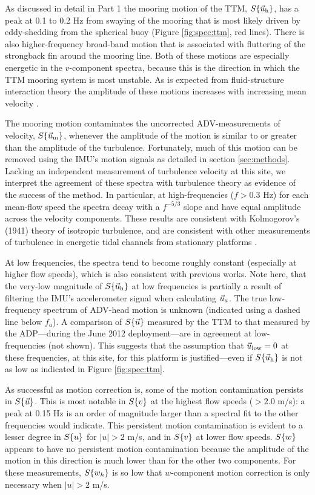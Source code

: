 As discussed in detail in Part 1 the mooring motion of the TTM, $S\{\vec{u}_\mathrm{h}\}$, has a peak at 0.1 to 0.2 Hz from swaying of the mooring that is most likely driven by eddy-shedding from the spherical buoy (Figure \ref{fig:spec:ttm}, red lines). There is also higher-frequency broad-band motion that is associated with fluttering of the strongback fin around the mooring line. Both of these motions are especially energetic in the $v$-component spectra, because this is the direction in which the TTM mooring system is most unstable. As is expected from fluid-structure interaction theory the amplitude of these motions increases with increasing mean velocity \cite[]{Morison++1950}.

The mooring motion contaminates the uncorrected ADV-measurements of velocity, $S\{\vec{u}_\mathrm{m}\}$, whenever the amplitude of the motion is similar to or greater than the amplitude of the turbulence. Fortunately, much of this motion can be removed using the IMU's motion signals as detailed in section \ref{sec:methods}. Lacking an independent measurement of turbulence velocity at this site, we interpret the agreement of these spectra with turbulence theory as evidence of the success of the method. In particular, at high-frequencies ($f>0.3$ Hz) for each mean-flow speed the spectra decay with a $f^{-5/3}$ slope and have equal amplitude across the velocity components. These results are consistent with Kolmogorov's (1941) theory of isotropic turbulence, and are consistent with other measurements of turbulence in energetic tidal channels from stationary platforms \cite[]{Kolmogorov1941c,Walter++2011,Thomson++2012,McMillan++2016}.

At low frequencies, the spectra tend to become roughly constant (especially at higher flow speeds), which is also consistent with previous works. Note here, that the very-low magnitude of $S\{\vec{u}_\mathrm{h}\}$ at low frequencies is partially a result of filtering the IMU's accelerometer signal when calculating $\vec{u}_a$. The true low-frequency spectrum of ADV-head motion is unknown (indicated using a dashed line below $f_a$). A comparison of $S\{\vec{u}\}$ measured by the TTM to that measured by the ADP---during the June 2012 deployment---are in agreement at low-frequencies (not shown). This suggests that the assumption that $\vec{u}_\mathrm{low}=0$ at these frequencies, at this site, for this platform is justified---even if $S\{\vec{u}_\mathrm{h}\}$ is not as low as indicated in Figure \ref{fig:spec:ttm}.

As successful as motion correction is, some of the motion contamination persists in $S\{\vec{u}\}$. This is most notable in $S\{v\}$ at the highest flow speeds ($>2.0$ m/s): a peak at 0.15 Hz is an order of magnitude larger than a spectral fit to the other frequencies would indicate. This persistent motion contamination is evident to a lesser degree in $S\{u\}$ for $|u|>2$ m/s, and in $S\{v\}$ at lower flow speeds.  $S\{w\}$ appears to have no persistent motion contamination because the amplitude of the motion in this direction is much lower than for the other two components. For these measurements, $S\{w_h\}$ is so low that $w$-component motion correction is only necessary when $|u| > 2$ m/s.

